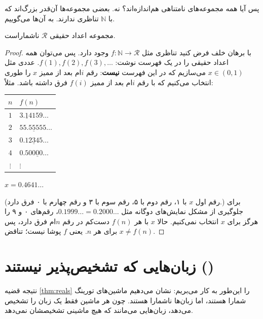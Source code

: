 پس آیا همه مجموعه‌های نامتناهی هم‌اندازه‌اند؟ نه. بعضی مجموعه‌ها آن‌قدر بزرگ‌اند که با $\mathbb{N}$ تناظری ندارند. به آن‌ها  می‌گوییم.

\begin{theorem}\label{thm:reals}
مجموعه اعداد حقیقی $\mathcal{R}$ ناشماراست.
\end{theorem}
\begin{proof}
با برهان خلف فرض کنید تناظری مثل $f:\mathbb{N}\to\mathcal{R}$ وجود دارد. پس می‌توان همه اعداد حقیقی را در یک فهرست نوشت: $f(1),f(2),f(3),\dots$. عددی مثل $x\in(0,1)$ می‌سازیم که در این فهرست \textbf{نیست}: رقم $i$ام بعد از ممیز $x$ را طوری انتخاب می‌کنیم که با رقم $i$ام بعد از ممیز $f(i)$ فرق داشته باشد. مثلاً:
\begin{ltrfig}
\begin{tabular}{c|l}
$n$ & $f(n)$\\ \hline
$1$ & $3.\underline{1}4159\ldots$\\
$2$ & $55.5\underline{5}555\ldots$\\
$3$ & $0.12\underline{3}45\ldots$\\
$4$ & $0.500\underline{0}0\ldots$\\
$\vdots$ & $\vdots$
\end{tabular}
\qquad\qquad $x=0.4641\ldots$
\end{ltrfig}
(رقم اول $x$ با ۱، رقم دوم با ۵، رقم سوم با ۳ و رقم چهارم با ۰ فرق دارد.) برای جلوگیری از مشکل نمایش‌های دوگانه مثل $0.1999\ldots=0.2000\ldots$، رقم‌های ۰ و ۹ را هرگز برای $x$ انتخاب نمی‌کنیم. حالا $x$ با هر $f(n)$ دست‌کم در رقم $n$ام فرق دارد، پس $x\neq f(n)$ برای هر $n$. یعنی $f$ پوشا نیست؛ تناقض.
\end{proof}

\section{زبان‌هایی که تشخیص‌پذیر نیستند ()}

نتیجه قضیه \ref{thm:reals} را این‌طور به کار می‌بریم: نشان می‌دهیم ماشین‌های تورینگ شمارا هستند، اما زبان‌ها ناشمارا هستند. چون هر ماشین فقط یک زبان را تشخیص می‌دهد، زبان‌هایی می‌مانند که هیچ ماشینی تشخیصشان نمی‌دهد.


